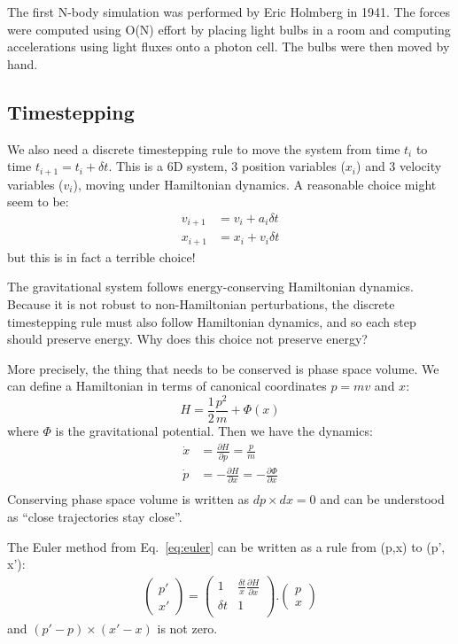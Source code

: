 \documentclass[12pt]{article}
\begin{document}
The first N-body simulation was performed by Eric Holmberg in 1941. The forces were computed using O(N) effort by placing light bulbs in a room and computing accelerations using light fluxes onto a photon cell. The bulbs were then moved by hand.

\subsection{Timestepping}

We also need a discrete timestepping rule to move the system from time $t_i$ to time $t_{i+1} = t_i + \delta t$. This is a 6D system, 3 position variables ($x_i$) and 3 velocity variables ($v_i$), moving under Hamiltonian dynamics. A reasonable choice might seem to be:
\begin{align}
v_{i+1} &= v_i + a_i \delta t \\
x_{i+1} &= x_i + v_i \delta t
\label{eq:euler}
\end{align}
but this is in fact a terrible choice!

The gravitational system follows energy-conserving Hamiltonian dynamics. Because it is not robust to non-Hamiltonian perturbations, the discrete timestepping rule must also follow Hamiltonian dynamics, and so each step should preserve energy. Why does this choice not preserve energy?

More precisely, the thing that needs to be conserved is phase space volume. We can define a Hamiltonian in terms of canonical coordinates $p = m v$ and $x$:
\begin{equation}
 H = \frac{1}{2} \frac{p^2}{m} + \Phi (x)
\end{equation}
where $\Phi$ is the gravitational potential.
Then we have the dynamics:
\begin{align}
 \dot{x} &= \frac{\partial H}{\partial p} = \frac{p}{m}\\
 \dot{p} &= - \frac{\partial H}{\partial x} = - \frac{\partial \Phi}{\partial x}\\
\end{align}
Conserving phase space volume is written as $dp \times dx = 0$ and can be understood as ``close trajectories stay close''.

The Euler method from Eq.~\ref{eq:euler} can be written as a rule from (p,x) to (p', x'):
\begin{align}
\begin{pmatrix}
 p' \\
 x'
\end{pmatrix}
=
\begin{pmatrix}
1 & \frac{\delta t}{x} \frac{\partial H}{\partial x} \\
\delta t & 1 \\
\end{pmatrix}
.
\begin{pmatrix}
 p \\
 x
\end{pmatrix}
\end{align}
and $(p' - p)\times (x' - x)$ is not zero.
\end{document}
